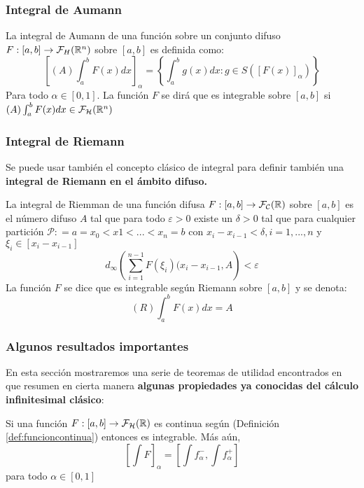 \subsubsection{Integral de Aumann}
\begin{definicion}
  La integral de Aumann de una función sobre un conjunto difuso $F : [a, b] \rightarrow \mathcal{F}_H(\mathbb R^n)$ sobre $[a, b]$ es definida como: 
  \[
  \left[
    (A) \int_{a}^{b} F(x) dx
    \right]_\alpha = \left\{
  \int_{a}^{b} g(x) dx : g \in S([F(x)]_\alpha)
  \right\}
  \]
  Para todo $\alpha \in [0, 1]$. La función $F$ se dirá que es integrable sobre $[a, b]$ si $(A) \int_{a}^{b} F(x) dx \in \mathcal{F}_\mathcal{H}(\mathbb R^n)$
\end{definicion}

\subsubsection{Integral de Riemann}
Se puede usar también el concepto clásico de integral para definir también una \textbf{integral de Riemann en el ámbito difuso.}

\begin{definicion}
  La integral de Riemman de una función difusa $F : [a, b] \rightarrow \mathcal{F}_\mathcal{C} (\mathbb R)$ sobre $[a, b]$ es el número difuso $A$ tal que para todo $\varepsilon > 0$ existe un $\delta > 0$ tal que para cualquier partición $\mathcal{P}: = a=x_0 < x1 < ... < x_n = b$ con $x_i - x_{i-1} < \delta, i = 1, ..., n$ y $\xi_i \in [x_i - x_{i-1}]$
  \[
  	d_\infty \left(
  		\sum_{i=1}^{n-1} F(\xi_i)(x_i - x_{i-1}, A
  	\right) < \varepsilon
  \]
  La función $F$ se dice que es integrable según Riemann sobre $[a, b]$ y se denota:
  \[
  	(R) \int_{a}^{b} F(x) dx = A
  \]
\end{definicion}

\subsubsection{Algunos resultados importantes}
En esta sección mostraremos una serie de teoremas de utilidad encontrados en \cite{integral2} que resumen en cierta manera \textbf{algunas propiedades ya conocidas del cálculo infinitesimal clásico}:

\begin{teorema}
  Si una función $F :  [a, b] \rightarrow \mathcal{F}_\mathcal{H}(\mathbb R)$ es continua según (Definición \ref{def:funcioncontinua}) entonces es integrable. Más aún,
  \[
  \left[
    \int F
    \right]_\alpha = \left[
    \int f_\alpha^-, \int f_\alpha^+
    \right]
  \] para todo $\alpha \in [0, 1]$
\end{teorema}

